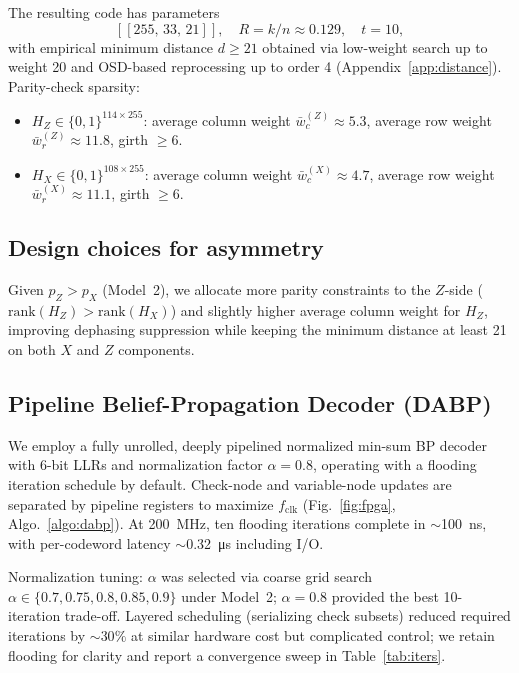 The resulting code has parameters
\[
  [[255,\,33,\,21]],\quad R=k/n\approx 0.129,\quad t=10,
\]
with empirical minimum distance \(d\ge 21\) obtained via low-weight search up to weight 20 and OSD-based reprocessing up to order 4 (Appendix~\ref{app:distance}). Parity-check sparsity:
\begin{itemize}[leftmargin=*,itemsep=1pt]
  \item \(H_Z\in\{0,1\}^{114\times 255}\): average column weight \(\bar{w}_c^{(Z)}\approx 5.3\), average row weight \(\bar{w}_r^{(Z)}\approx 11.8\), girth \(\ge 6\).
  \item \(H_X\in\{0,1\}^{108\times 255}\): average column weight \(\bar{w}_c^{(X)}\approx 4.7\), average row weight \(\bar{w}_r^{(X)}\approx 11.1\), girth \(\ge 6\).
\end{itemize}

\subsection{Design choices for asymmetry}
Given \(p_Z>p_X\) (Model~2), we allocate more parity constraints to the \(Z\)-side (\(\mathrm{rank}(H_Z)>\mathrm{rank}(H_X)\)) and slightly higher average column weight for \(H_Z\), improving dephasing suppression while keeping the minimum distance at least 21 on both \(X\) and \(Z\) components.

\subsection{Pipeline Belief-Propagation Decoder (DABP)}\label{sec:implementation}
We employ a fully unrolled, deeply pipelined normalized min-sum BP decoder with 6-bit LLRs and normalization factor \(\alpha=0.8\), operating with a flooding iteration schedule by default. Check-node and variable-node updates are separated by pipeline registers to maximize \(f_\mathrm{clk}\) (Fig.~\ref{fig:fpga}, Algo.~\ref{algo:dabp}). At \SI{200}{\mega\hertz}, ten flooding iterations complete in \(\sim\)\SI{100}{\nano\second}, with per-codeword latency \(\sim\)\SI{0.32}{\micro\second} including I/O.

Normalization tuning: \(\alpha\) was selected via coarse grid search \(\alpha\in\{0.7,0.75,0.8,0.85,0.9\}\) under Model~2; \(\alpha=0.8\) provided the best 10-iteration trade-off. Layered scheduling (serializing check subsets) reduced required iterations by \(\sim 30\%\) at similar hardware cost but complicated control; we retain flooding for clarity and report a convergence sweep in Table~\ref{tab:iters}.

